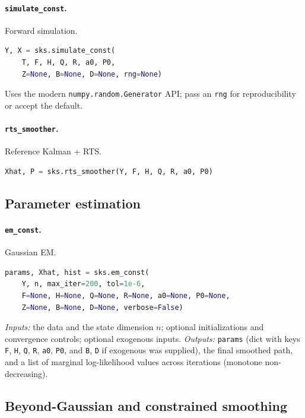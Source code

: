 \documentclass[11pt]{article}
\begin{document}
\paragraph{\texttt{simulate\_const}.}  Forward simulation.
\begin{lstlisting}[language=Python]
Y, X = sks.simulate_const(
    T, F, H, Q, R, a0, P0,
    Z=None, B=None, D=None, rng=None)
\end{lstlisting}
Uses the modern \texttt{numpy.random.Generator} API; pass an
\texttt{rng} for reproducibility or accept the default.

\paragraph{\texttt{rts\_smoother}.}  Reference Kalman + RTS.
\begin{lstlisting}[language=Python]
Xhat, P = sks.rts_smoother(Y, F, H, Q, R, a0, P0)
\end{lstlisting}

\subsection{Parameter estimation}

\paragraph{\texttt{em\_const}.}  Gaussian EM.
\begin{lstlisting}[language=Python]
params, Xhat, hist = sks.em_const(
    Y, n, max_iter=200, tol=1e-6,
    F=None, H=None, Q=None, R=None, a0=None, P0=None,
    Z=None, B=None, D=None, verbose=False)
\end{lstlisting}
\emph{Inputs:} the data and the state dimension $n$; optional
initializations and convergence controls; optional exogenous inputs.
\emph{Outputs:} \texttt{params} (dict with keys \texttt{F},
\texttt{H}, \texttt{Q}, \texttt{R}, \texttt{a0}, \texttt{P0}, and
\texttt{B}, \texttt{D} if exogenous was supplied), the final smoothed
path, and a list of marginal log-likelihood values across iterations
(monotone non-decreasing).

\subsection{Beyond-Gaussian and constrained smoothing}
\end{document}

